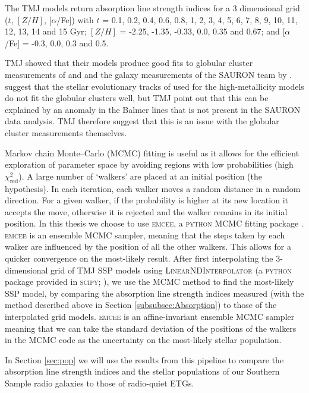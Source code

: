 			The TMJ models return absorption line strength indices for a 3 dimensional grid ($t$, $[Z/H]$, [$\alpha$/Fe]) with $t$ = 0.1, 0.2, 0.4, 0.6, 0.8, 1, 2, 3, 4, 5, 6, 7, 8, 9, 10, 11, 12, 13, 14 and 15 Gyr; $[Z/H]$ = -2.25, -1.35, -0.33, 0.0, 0.35 and 0.67; and [$\alpha$/Fe] = -0.3, 0.0, 0.3 and 0.5.

			TMJ showed that their models produce good fits to globular cluster measurements of \citet{Puzia2002} and \citet{Schiavon2005} and the galaxy measurements of the SAURON team by \citet{Kuntschner2010}. \citet{Conroy2010} suggest that the stellar evolutionary tracks of \citet{Girardi2000} used for the high-metallicity models do not fit the globular clusters well, but TMJ point out that this can be explained by an anomaly in the Balmer lines that is not present in the SAURON data analysis. TMJ therefore suggest that this is an issue with the globular cluster measurements themselves. 


			Markov chain Monte--Carlo (MCMC) fitting is useful as it allows for the efficient exploration of parameter space by avoiding regions with low probabilities (high $\chi^2_\text{red}$). A large number of `walkers' are placed at an initial position (the hypothesis). In each iteration, each walker moves a random distance in a random direction. For a given walker, if the probability is higher at its new location it accepts the move, otherwise it is rejected and the walker remains in its initial position. In this thesis we choose to use \textsc{emcee}, a \textsc{python} MCMC fitting package \citep{Foreman-Mackey2013}. \textsc{emcee} is an ensemble MCMC sampler, meaning that the steps taken by each walker are influenced by the position of all the other walkers. This allows for a quicker convergence on the most-likely result. After first interpolating the 3-dimensional grid of TMJ SSP models using \textsc{LinearNDInterpolator} (a \textsc{python} package provided in \textsc{scipy}; \citealt{Barber1996}), we use the MCMC method to find the most-likely SSP model, by comparing the absorption line strength indices measured (with the method described above in Section \ref{subsubsec:Absorption}) to those of the interpolated grid models. \textsc{emcee} is an affine-invariant ensemble MCMC sampler meaning that we can take the standard deviation of the positions of the walkers in the MCMC code as the uncertainty on the most-likely stellar population.

			In Section \ref{sec:pop} we will use the results from this pipeline to compare the absorption line strength indices and the stellar populations of our Southern Sample radio galaxies to those of radio-quiet ETGs.
